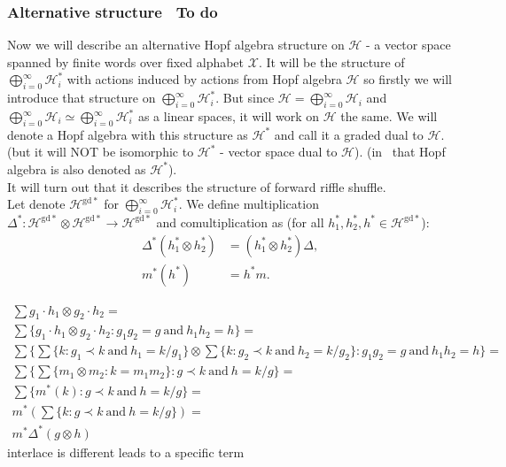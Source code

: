\documentclass[a4paper]{article}
\newcommand{\gdd}[1]{#1^{\mathrm{gd}*}}
\newcommand{\smalltodo}[1]{\textbf{\ To do}}
\begin{document}
\subsubsection{Alternative structure \smalltodo{a}}
\indent Now we will describe an alternative Hopf algebra structure on $\mathcal{H}$ - a vector space spanned 
by finite words over fixed alphabet $\mathcal{X}$. It will be the 
structure of $\displaystyle\bigoplus^{\infty}_{i = 0} \mathcal{H}_i^*$ with actions induced by actions from 
Hopf algebra $\mathcal{H}$ so firstly we will introduce that structure on  
$\displaystyle\bigoplus^{\infty}_{i = 0} \mathcal{H}_i^*$. But since $\mathcal{H} = 
\displaystyle\bigoplus^{\infty}_{i = 0} \mathcal{H}_i$ and $\displaystyle\bigoplus^{\infty}_{i = 0}
\mathcal{H}_i \simeq \displaystyle\bigoplus^{\infty}_{i = 0} \mathcal{H}_i^*$ as a linear spaces, it will
work on $\mathcal{H}$ the same. We will denote a Hopf algebra with this structure 
as $\mathcal{H}^*$ and call it a graded dual to $\mathcal{H}$. (but it will NOT be isomorphic to 
$\mathcal{H}^*$ - vector space dual to $\mathcal{H}$). (in~\cite{Diaconis2014} that Hopf algebra is also 
denoted as $\mathcal{H}^*$).  \\
It will turn out that it describes the structure of forward riffle shuffle. \\
\indent Let denote $\gdd{\mathcal{H}}$ for $\displaystyle\bigoplus^{\infty}_{i = 0} \mathcal{H}_i^*$.
We define multiplication 
$\Delta^* : \mathcal{H}^{\mathrm{gd}*} \otimes \gdd{\mathcal{H}} \to \gdd{\mathcal{H}}$ and 
comultiplication 
\text{$m^* : \gdd{\mathcal{H}} \to \gdd{\mathcal{H}} \otimes \gdd{\mathcal{H}}$} as 
(for all $h_1^*, h_2^*, h^* \in \gdd{\mathcal{H}}$):
\begin{align*}
\Delta^*(h_1^* \otimes h_2^*) &= (h_1^* \otimes h_2^*)\Delta, \\
m^*(h^*) &= h^*m.
\end{align*}

\begin{gather*}
\sum g_1 \cdot h_1 \otimes g_2 \cdot h_2 = \\
\sum \{g_1 \cdot h_1 \otimes g_2 \cdot h_2 : g_1g_2=g \mathrm{\ and\ } h_1h_2 = h\} =\\
\sum \{ \sum\{k : g_1 \prec k \mathrm{\ and\ } h_1 = k/g_1\} \otimes 
\sum\{k : g_2 \prec k \mathrm{\ and\ } h_2 = k/g_2\} : g_1g_2=g \mathrm{\ and\ } h_1h_2 = h\} = \\
\sum\{ \sum\{ m_1 \otimes m_2 : k=m_1m_2 \} : g \prec k \mathrm{\ and\ } h = k/g\} = \\
\sum\{m^*(k) : g \prec k \mathrm{\ and\ } h = k/g\} = \\
m^*\left(\sum\{k : g \prec k \mathrm{\ and\ } h = k/g\}\right) = \\
m^*\Delta^*(g \otimes h)
\end{gather*}
interlace is different 
leads to a specific term
\end{document}
